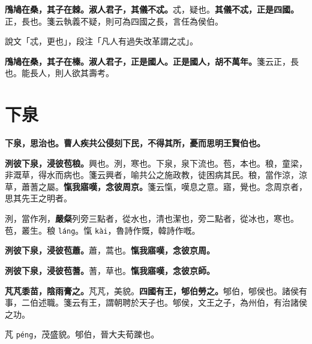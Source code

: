 \textbf{鳲鳩在桑，其子在棘。淑人君子，其儀不忒。}{\footnotesize 忒，疑也。}\textbf{其儀不忒，正是四國。}{\footnotesize 正，長也。箋云執義不疑，則可為四國之長，言任為侯伯。}

\begin{quoting}說文「忒，更也」，段注「凡人有過失改革謂之忒」。\end{quoting}

\textbf{鳲鳩在桑，其子在榛。淑人君子，正是國人。正是國人，胡不萬年。}{\footnotesize 箋云正，長也。能長人，則人欲其壽考。}

\section{下泉}


\textbf{下泉，思治也。曹人疾共公侵刻下民，不得其所，憂而思明王賢伯也。}

\textbf{洌彼下泉，浸彼苞稂。}{\footnotesize 興也。洌，寒也。下泉，泉下流也。苞，本也。稂，童梁，非溉草，得水而病也。箋云興者，喻共公之施政教，徒困病其民。稂，當作涼，涼草，蕭蓍之屬。}\textbf{愾我寤嘆，念彼周京。}{\footnotesize 箋云愾，嘆息之意。寤，覺也。念周京者，思其先王之明者。}

\begin{quoting}洌，當作冽，\textbf{嚴粲}列旁三點者，從水也，清也潔也，旁二點者，從冰也，寒也。苞，叢生。稂 \texttt{láng}。愾 \texttt{kài}，魯詩作慨，韓詩作嘅。\end{quoting}

\textbf{洌彼下泉，浸彼苞蕭。}{\footnotesize 蕭，蒿也。}\textbf{愾我寤嘆，念彼京周。}

\textbf{洌彼下泉，浸彼苞蓍。}{\footnotesize 蓍，草也。}\textbf{愾我寤嘆，念彼京師。}

\textbf{芃芃黍苗，陰雨膏之。}{\footnotesize 芃芃，美貌。}\textbf{四國有王，郇伯勞之。}{\footnotesize 郇伯，郇侯也。諸侯有事，二伯述職。箋云有王，謂朝聘於天子也。郇侯，文王之子，為州伯，有治諸侯之功。}

\begin{quoting}芃 \texttt{péng}，茂盛貌。郇伯，晉大夫荀躒也。\end{quoting}

